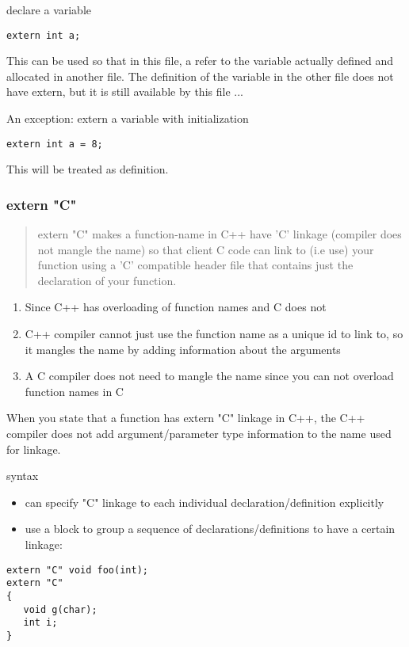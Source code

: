 declare a variable

\begin{lstlisting}
extern int a;
\end{lstlisting}

This can be used so that in this file, a refer to the variable
actually defined and allocated in another file.  The definition of the
variable in the other file does not have extern, but it is still
available by this file ...

An exception: extern a variable with initialization

\begin{lstlisting}
extern int a = 8;
\end{lstlisting}

This will be treated as definition.

\subsubsection{extern "C"}
\begin{quote}
extern "C" makes a function-name in C++ have 'C' linkage
(compiler does not mangle the name)
so that client C code can link to (i.e use) your function
using a 'C' compatible header file
that contains just the declaration of your function.
\end{quote}

\begin{enumerate}
\item Since C++ has overloading of function names and C does not
\item C++ compiler cannot just use the function name as a unique id to link to, so it mangles the name by adding information about the arguments
\item A C compiler does not need to mangle the name since you can not overload function names in C
\end{enumerate}

When you state that a function has extern "C" linkage in C++,
the C++ compiler does not add argument/parameter type information
to the name used for linkage.

syntax
\begin{itemize}
\item can specify "C" linkage to each individual declaration/definition explicitly
\item use a block to group a sequence of declarations/definitions to have a certain linkage:
\end{itemize}
\begin{lstlisting}
extern "C" void foo(int);
extern "C"
{
   void g(char);
   int i;
}
\end{lstlisting}


